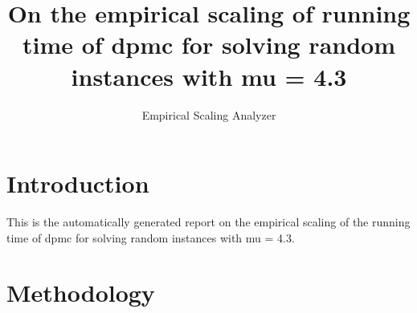 \newcommand{\updatedYP}[1]{#1}
\newcommand{\yp}[1]{#1}
\newcommand{\orange}[1]{#1}
\newcommand{\evalModels}[1]{#1}
\newcommand{\bestBoot}[1]{#1}

\newcommand{\medianInterval}[1]{}
\newcommand{\randomizedAlgorithm}[1]{}
\newcommand{\quantileRegression}[1]{}
\renewcommand{\quantileRegression}[1]{#1}

\makeatletter

\providecommand{\tabularnewline}{\\}


\title{On the empirical scaling of running time of dpmc for solving random instances with mu = 4.3}
\author{Empirical Scaling Analyzer}

\makeatother

\usepackage{babel}

\maketitle %


\section{Introduction}

This is the automatically generated report on the empirical scaling
of the running time of dpmc for solving random instances with mu = 4.3.


\section{Methodology}

\label{sec:Methodology}

